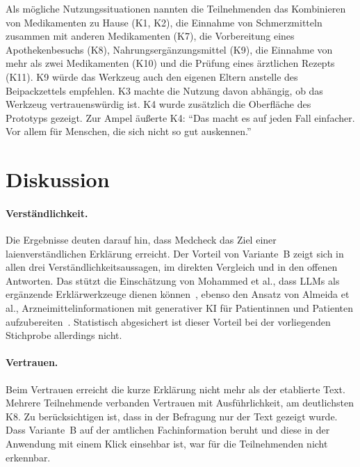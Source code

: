 Als mögliche Nutzungssituationen nannten die Teilnehmenden das Kombinieren von Medikamenten zu Hause (K1, K2), die Einnahme von Schmerzmitteln zusammen mit anderen Medikamenten (K7), die Vorbereitung eines Apothekenbesuchs (K8), Nahrungsergänzungsmittel (K9), die Einnahme von mehr als zwei Medikamenten (K10) und die Prüfung eines ärztlichen Rezepts (K11). K9 würde das Werkzeug auch den eigenen Eltern anstelle des Beipackzettels empfehlen. K3 machte die Nutzung davon abhängig, ob das Werkzeug vertrauenswürdig ist. K4 wurde zusätzlich die Oberfläche des Prototyps gezeigt. Zur Ampel äußerte K4: \enquote{Das macht es auf jeden Fall einfacher. Vor allem für Menschen, die sich nicht so gut auskennen.}

\section{Diskussion}

\paragraph{Verständlichkeit.} Die Ergebnisse deuten darauf hin, dass Medcheck das Ziel einer laienverständlichen Erklärung erreicht. Der Vorteil von Variante~B zeigt sich in allen drei Verständlichkeitsaussagen, im direkten Vergleich und in den offenen Antworten. Das stützt die Einschätzung von Mohammed et al., dass LLMs als ergänzende Erklärwerkzeuge dienen können~\cite{MOHAMMED2026100733}, ebenso den Ansatz von Almeida et al., Arzneimittelinformationen mit generativer KI für Patientinnen und Patienten aufzubereiten~\cite{Almeida2025}. Statistisch abgesichert ist dieser Vorteil bei der vorliegenden Stichprobe allerdings nicht.

\paragraph{Vertrauen.} Beim Vertrauen erreicht die kurze Erklärung nicht mehr als der etablierte Text. Mehrere Teilnehmende verbanden Vertrauen mit Ausführlichkeit, am deutlichsten K8. Zu berücksichtigen ist, dass in der Befragung nur der Text gezeigt wurde. Dass Variante~B auf der amtlichen Fachinformation beruht und diese in der Anwendung mit einem Klick einsehbar ist, war für die Teilnehmenden nicht erkennbar.

